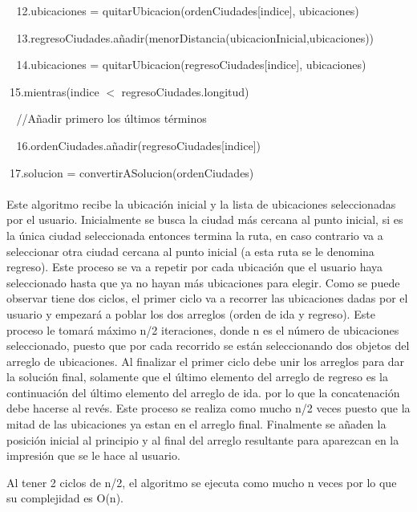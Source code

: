 \documentclass[10pt]{report}
\begin{document}
$\;$
$\;$12.ubicaciones = quitarUbicacion(ordenCiudades[indice], ubicaciones)

$\;$
$\;$13.regresoCiudades.añadir(menorDistancia(ubicacionInicial,ubicaciones))

$\;$
$\;$14.ubicaciones = quitarUbicacion(regresoCiudades[indice], ubicaciones)

$\;$15.mientras(indice $<$ regresoCiudades.longitud)

$\;$
$\;$//Añadir primero los \'{u}ltimos t\'{e}rminos

$\;$
$\;$16.ordenCiudades.añadir(regresoCiudades[indice])

$\;$17.solucion = convertirASolucion(ordenCiudades)
\\
\\
Este algoritmo recibe la ubicaci\'{o}n inicial y la lista de ubicaciones seleccionadas por el usuario. Inicialmente se busca la ciudad más cercana al punto inicial, si es la \'{u}nica ciudad seleccionada entonces termina la ruta, en caso contrario va a seleccionar otra ciudad cercana al punto inicial (a esta ruta se le denomina regreso). Este proceso se va a repetir por cada ubicaci\'{o}n que el usuario haya seleccionado hasta que ya no hayan m\'{a}s ubicaciones para elegir. Como se puede observar tiene dos ciclos, el primer ciclo va a recorrer las ubicaciones dadas por el usuario y empezar\'{a} a poblar los dos arreglos (orden de ida y regreso). Este proceso le tomar\'{a} m\'{a}ximo n/2 iteraciones, donde n es el n\'{u}mero de ubicaciones seleccionado, puesto que por cada recorrido se est\'{a}n seleccionando dos objetos del arreglo de ubicaciones. Al finalizar el primer ciclo debe unir los arreglos para dar la soluci\'{o}n final, solamente que el \'{u}ltimo elemento del arreglo de regreso es la continuaci\'{o}n del \'{u}ltimo elemento del arreglo de ida. por lo que la concatenaci\'{o}n debe hacerse al rev\'{e}s. Este proceso se realiza como mucho n/2 veces puesto que la mitad de las ubicaciones ya estan en el arreglo final. Finalmente se añaden la posici\'{o}n inicial al principio y al final del arreglo resultante para aparezcan en la impresi\'{o}n que se le hace al usuario.

Al tener 2 ciclos de n/2, el algoritmo se ejecuta como mucho n veces por lo que su complejidad es O(n).
\end{document}
